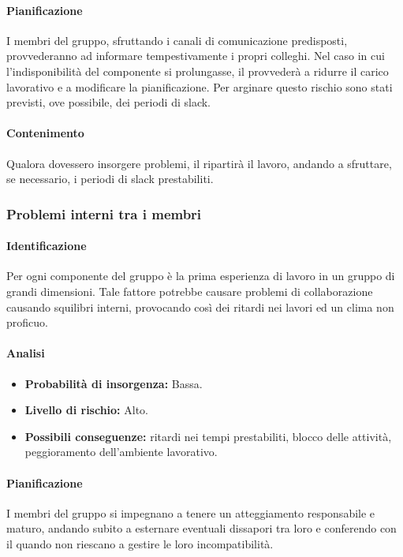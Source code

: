 \paragraph {Pianificazione}
I membri del gruppo, sfruttando i canali di comunicazione predisposti, provvederanno ad informare tempestivamente i propri colleghi. Nel caso in cui l'indisponibilità del componente si prolungasse, il \RdP{} provvederà a ridurre il carico lavorativo e a modificare la pianificazione. Per arginare questo rischio sono stati previsti, ove possibile, dei periodi di slack.

\paragraph {Contenimento}
Qualora dovessero insorgere problemi, il \RdP{} ripartirà il lavoro, andando a sfruttare, se necessario, i periodi di slack prestabiliti. 

\subsubsection{Problemi interni tra i membri}
\paragraph {Identificazione}
Per ogni componente del gruppo è la prima esperienza di lavoro in un gruppo di grandi dimensioni. Tale fattore potrebbe causare problemi di collaborazione causando squilibri interni, provocando così dei ritardi nei lavori ed un clima non proficuo.

\paragraph {Analisi}
\begin{itemize}
	\item \textbf{Probabilità di insorgenza:} Bassa.
	\item \textbf{Livello di rischio:} Alto.
	\item \textbf{Possibili conseguenze:} ritardi nei tempi prestabiliti, blocco delle attività, peggioramento dell'ambiente lavorativo.
\end{itemize}

\paragraph {Pianificazione}
I membri del gruppo si impegnano a tenere un atteggiamento responsabile e maturo, andando subito a esternare eventuali dissapori tra loro e conferendo con il \RdP{} quando non riescano a gestire le loro incompatibilità.

